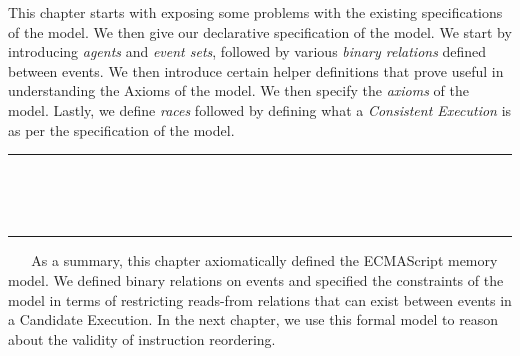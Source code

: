 This chapter starts with exposing some problems with the existing specifications of the model. 
We then give our declarative specification of the model. 
We start by introducing \textit{agents} and \textit{event sets}, followed by various \textit{binary relations} defined between events. 
We then introduce certain helper definitions that prove useful in understanding the Axioms of the model. 
We then specify the \textit{axioms} of the model.
Lastly, we define \textit{races} followed by defining what a \textit{Consistent Execution} is as per the specification of the model.  
\ \newline
\ \newline  
\hrule 
\ \newline 
\ \newline 



















\ \newline
\ \newline  
\hrule 
\ \newline 
\ \newline 
As a summary, this chapter axiomatically defined the ECMAScript memory model. 
We defined binary relations on events and specified the constraints of the model in terms of restricting reads-from relations that can exist between events in a Candidate Execution.
In the next chapter, we use this formal model to reason about the validity of instruction reordering.